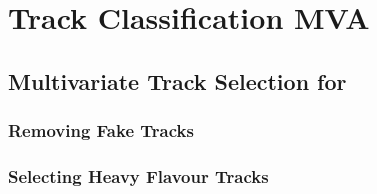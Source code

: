 \chapter{Track Classification MVA}\label{chap:track_classification_mva}

\section{Multivariate Track Selection for \texorpdfstring{\btagging}{b-tagging}}
\label{sec:mva track selection}

\subsection{Removing Fake Tracks}\label{sec:remove fakes mva}
\subsection{Selecting Heavy Flavour Tracks}\label{sec:keep hf mva}
